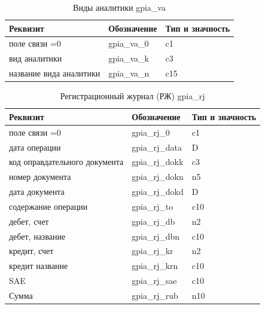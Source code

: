 \begin{table}[h!p]
    \centering
    \scriptsize
    \caption{Виды аналитики gpia\_va}
    \begin{tabular}{|l|l|l|} 

                                                                               \hline
\textbf{Реквизит}       &\textbf{Обозначение}   &\textbf{Тип и значность}   \\ \hline
поле связи  	  =0    &gpia\_va\_0            &c1                         \\ \hline
вид аналитики           &gpia\_va\_k            &c3                         \\ \hline
название вида аналитики &gpia\_va\_n            &c15                        \\ \hline

    \end{tabular}
\end{table}

\begin{table}[h!p]
    \centering
    \scriptsize
    \caption{Регистрационный журнал (РЖ) gpia\_rj}
    \begin{tabular}{|l|l|l|} 

                                                                                   \hline
\textbf{Реквизит}           &\textbf{Обозначение}   &\textbf{Тип и значность}   \\ \hline
поле связи	=0              &gpia\_rj\_0            &c1                         \\ \hline
дата операции               &gpia\_rj\_data         &D                          \\ \hline
код оправдательного документа&gpia\_rj\_dokk        &c3                         \\ \hline
номер документа             &gpia\_rj\_dokn         &n5                         \\ \hline
дата документа              &gpia\_rj\_dokd         &D                          \\ \hline
содержание операции         &gpia\_rj\_to           &c10                        \\ \hline
дебет, счет                 &gpia\_rj\_db           &n2                         \\ \hline
дебет, название             &gpia\_rj\_dbn          &c10                        \\ \hline
кредит, счет                &gpia\_rj\_kr           &n2                         \\ \hline
кредит название             &gpia\_rj\_krn          &c10                        \\ \hline
SAE                         &gpia\_rj\_sae          &c10                        \\ \hline
Сумма                       &gpia\_rj\_rub          &n10                        \\ \hline

    \end{tabular}
\end{table}

